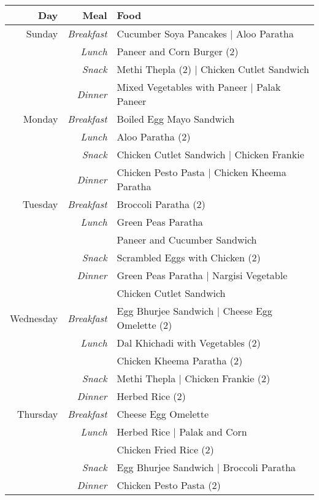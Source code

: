 \documentclass[twoside]{article}
\begin{document}
\begin{table}
    \centering
    \begin{tabular}{rr|l}
        \textbf{Day} & \textbf{Meal} & \textbf{Food}\\
        \hline
        Sunday & \textit{Breakfast} & Cucumber Soya Pancakes | Aloo Paratha\\
        & \textit{Lunch} & Paneer and Corn Burger (2)\\
        & \textit{Snack} & Methi Thepla (2) | Chicken Cutlet Sandwich\\
        & \textit{Dinner} & Mixed Vegetables with Paneer | Palak Paneer\\
        Monday & \textit{Breakfast} & Boiled Egg Mayo Sandwich\\
        & \textit{Lunch} & Aloo Paratha (2)\\
        & \textit{Snack} & Chicken Cutlet Sandwich | Chicken Frankie \\
        & \textit{Dinner} & Chicken Pesto Pasta | Chicken Kheema Paratha\\
        Tuesday & \textit{Breakfast} & Broccoli Paratha (2)\\
        & \textit{Lunch} & Green Peas Paratha\\
        & & Paneer and Cucumber Sandwich\\
        & \textit{Snack} & Scrambled Eggs with Chicken (2)\\
        & \textit{Dinner} & Green Peas Paratha | Nargisi Vegetable\\ 
        & & Chicken Cutlet Sandwich\\
        Wednesday & \textit{Breakfast} & Egg Bhurjee Sandwich | Cheese Egg Omelette (2)\\
        & \textit{Lunch} & Dal Khichadi with Vegetables (2)\\
        & & Chicken Kheema Paratha (2)\\
        & \textit{Snack} & Methi Thepla | Chicken Frankie (2)\\
        & \textit{Dinner} & Herbed Rice (2)\\
        Thursday & \textit{Breakfast} & Cheese Egg Omelette\\
        & \textit{Lunch} & Herbed Rice | Palak and Corn\\
        & & Chicken Fried Rice (2)\\
        & \textit{Snack} & Egg Bhurjee Sandwich | Broccoli Paratha\\
        & \textit{Dinner} & Chicken Pesto Pasta (2)\\

\end{tabular}
\end{table}
\end{document}
